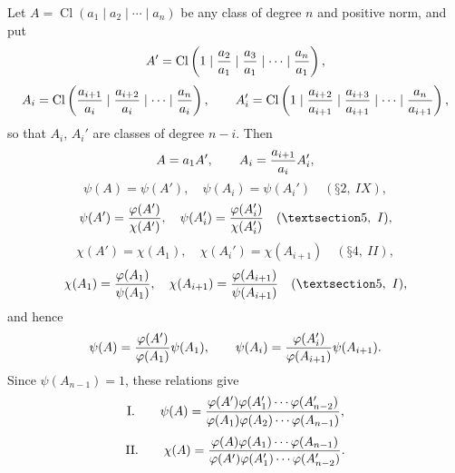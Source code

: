 \documentclass[11pt,a4paper]{article}
\newcommand{\Cl}{\operatorname{Cl}}
\begin{document}
Let $A=\Cl(a_1\mid a_2\mid\cdots\mid a_n)$ be any class of degree $n$ and positive norm, and put
\[
 A'=\Cl\left(1\mid {a_2\over a_1}\mid {a_3\over a_1}\mid\cdots\mid {a_n\over a_1}\right),
\]
\[
 A_i=\Cl\left({a_{i+1}\over a_i}\mid {a_{i+2}\over a_i}\mid\cdots\mid {a_n\over a_i}\right),
\qquad
 A_i'=\Cl\left(1\mid {a_{i+2}\over a_{i+1}}\mid {a_{i+3}\over a_{i+1}}\mid\cdots\mid {a_n\over a_{i+1}}\right),
\]
so that $A_i$, $A_i'$ are classes of degree $n-i$. Then
\[
 A=a_1A',\qquad A_i={a_{i+1}\over a_i}A_i',
\]
\[
 \psi(A)=\psi(A'),\quad \psi(A_i)=\psi(A_i')\quad (§ 2,\ IX),
\]
\[
 \psi(A')={\varphi(A')\over\chi(A')},\quad
 \psi(A_i')={\varphi(A_i')\over\chi(A_i')}\quad (§ 5,\ I),
\]
\[
 \chi(A')=\chi(A_1),\quad \chi(A_i')=\chi(A_{i+1})\quad (§ 4,\ II),
\]
\[
 \chi(A_1)={\varphi(A_1)\over\psi(A_1)},\quad
 \chi(A_{i+1})={\varphi(A_{i+1})\over\psi(A_{i+1})}\quad (§ 5,\ I),
\]
and hence
\[
 \psi(A)={\varphi(A')\over\varphi(A_1)}\psi(A_1),
 \qquad
 \psi(A_i)={\varphi(A_i')\over\varphi(A_{i+1})}\psi(A_{i+1}).
\]
Since $\psi(A_{n-1})=1$, these relations give
\[
\text{I.}\qquad
 \psi(A)={\varphi(A')\varphi(A_1')\cdots\varphi(A_{n-2}')
 \over
 \varphi(A_1)\varphi(A_2)\cdots\varphi(A_{n-1})},
\]
\[
\text{II.}\qquad
 \chi(A)={\varphi(A)\varphi(A_1)\cdots\varphi(A_{n-1})
 \over
 \varphi(A')\varphi(A_1')\cdots\varphi(A_{n-2}')}.
\]
\end{document}
